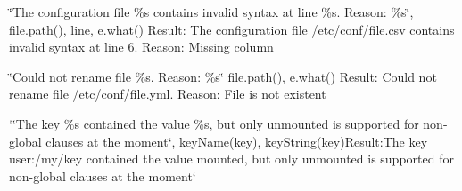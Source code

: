 \begin{DoxyItemize}
\item {\ttfamily \char`\"{}\+The configuration file \%s contains invalid syntax at line \%s. Reason\+: \%s\char`\"{}, file.\+path(), line, e.\+what()} Result\+: {\ttfamily The configuration file /etc/conf/file.csv contains invalid syntax at line 6. Reason\+: Missing column}
\item {\ttfamily \char`\"{}\+Could not rename file \%s. Reason\+: \%s\char`\"{} file.\+path(), e.\+what()} Result\+: {\ttfamily Could not rename file /etc/conf/file.yml. Reason\+: File is not existent}
\item `\char`\"{}\+The key \%s contained the value \textquotesingle{}\%s\textquotesingle{}, but only \textquotesingle{}unmounted\textquotesingle{} is supported for non-\/global clauses at the moment\char`\"{}, key\+Name(key), key\+String(key){\ttfamily  Result\+:}The key user\+:/my/key contained the value \textquotesingle{}mounted\textquotesingle{}, but only \textquotesingle{}unmounted\textquotesingle{} is supported for non-\/global clauses at the moment` 
\end{DoxyItemize}